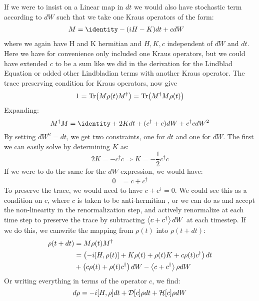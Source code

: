If we were to insist on a Linear map in $dt$ we would also have stochastic term according to $dW$ such that we take one Kraus operators of the form:
\begin{align}
    M &=  \identity - (iH - K)dt + cdW
\end{align}
where we again have H and K hermitian and $H, K, c$ independent of $dW$ and $dt$. Here we have for convenience only included one Kraus operators, but we could have extended $c$ to be a sum like we did in the derivation for the Lindblad Equation or added other Lindbladian terms with another Kraus operator. The trace preserving condition for Kraus operators, now give
\begin{equation}
    1 = \Tr(M \rho(t) M^\dagger) = \Tr(M^\dagger M \rho(t))
\end{equation}
Expanding:
\begin{equation}\label{eq:trace_conservation}
    M^\dagger M  = \identity + 2K dt +  (c^\dagger + c)dW + c^\dagger c dW^2
\end{equation}
By setting $dW^2 = dt$, we get two constraints, one for $dt$ and one for $dW$. The first we can easily solve by determining $K$ as:
\begin{equation}
    2K = -c^\dagger c \Rightarrow K = -\frac12 c^\dagger c 
\end{equation}
If we were to do the same for the $dW$ expression, we would have:
\begin{align}
    0 &= c + c^\dagger
\end{align}
To preserve the trace, we would need to have $c + c^\dagger = 0$. We could see this as a condition on $c$, where $c$ is taken to be anti-hermitian \cite{adler_derivation_2000}, or we can do as \cite{jacobs_straightforward_2006} and accept the non-linearity in the renormalization step, and actively renormalize at each time step to preserve the trace by subtracting $\expval{c + c^\dagger}dW$ at each timestep. If we do this, we  canwrite the mapping from $\rho(t)$ into $\rho(t+dt)$:
\begin{align}
    \rho(t+dt) &= M \rho(t) M^\dagger \\
               &= \left(-i \comm{H}{\rho(t)} + K\rho(t) + \rho(t)K + c\rho(t)c^\dagger \right) dt \\
            &+\left(c\rho(t) + \rho(t)c^\dagger\right)dW  - \expval{c + c^\dagger}\rho dW
\end{align}
Or writing everything in terms of the operator $c$, we find:
\begin{equation}
    d\rho = -i \comm{H}{\rho}dt + \mathcal{D}[c]\rho dt + \mathcal{H}[c] \rho dW
\end{equation}
